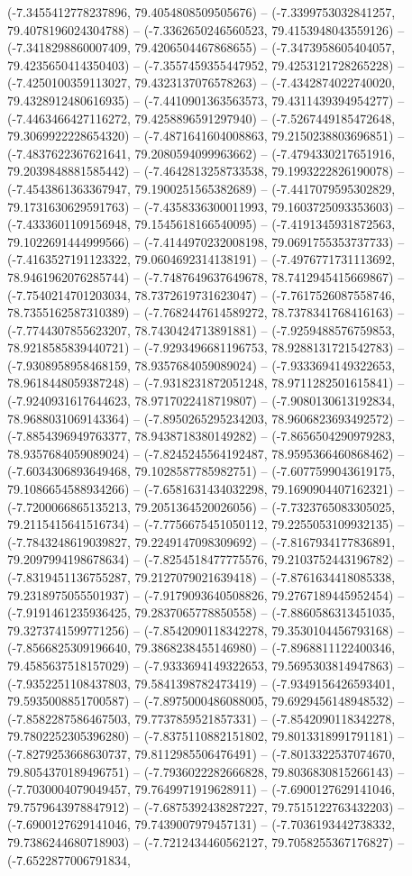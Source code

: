 (-7.3455412778237896, 79.4054808509505676) -- (-7.3399753032841257, 79.4078196024304788) -- (-7.3362650246560523, 79.4153948043559126) -- (-7.3418298860007409, 79.4206504467868655) -- (-7.3473958605404057, 79.4235650414350403) -- (-7.3557459355447952, 79.4253121728265228) -- (-7.4250100359113027, 79.4323137076578263) -- (-7.4342874022740020, 79.4328912480616935) -- (-7.4410901363563573, 79.4311439394954277) -- (-7.4463466427116272, 79.4258896591297940) -- (-7.5267449185472648, 79.3069922228654320) -- (-7.4871641604008863, 79.2150238803696851) -- (-7.4837622367621641, 79.2080594099963662) -- (-7.4794330217651916, 79.2039848881585442) -- (-7.4642813258733538, 79.1993222826190078) -- (-7.4543861363367947, 79.1900251565382689) -- (-7.4417079595302829, 79.1731630629591763) -- (-7.4358336300011993, 79.1603725093353603) -- (-7.4333601109156948, 79.1545618166540095) -- (-7.4191345931872563, 79.1022691444999566) -- (-7.4144970232008198, 79.0691755353737733) -- (-7.4163527191123322, 79.0604692314138191) -- (-7.4976771731113692, 78.9461962076285744) -- (-7.7487649637649678, 78.7412945415669867) -- (-7.7540214701203034, 78.7372619731623047) -- (-7.7617526087558746, 78.7355162587310389) -- (-7.7682447614589272, 78.7378341768416163) -- (-7.7744307855623207, 78.7430424713891881) -- (-7.9259488576759853, 78.9218585839440721) -- (-7.9293496681196753, 78.9288131721542783) -- (-7.9308958958468159, 78.9357684059089024) -- (-7.9333694149322653, 78.9618448059387248) -- (-7.9318231872051248, 78.9711282501615841) -- (-7.9240931617644623, 78.9717022418719807) -- (-7.9080130613192834, 78.9688031069143364) -- (-7.8950265295234203, 78.9606823693492572) -- (-7.8854396949763377, 78.9438718380149282) -- (-7.8656504290979283, 78.9357684059089024) -- (-7.8245245564192487, 78.9595366460868462) -- (-7.6034306893649468, 79.1028587785982751) -- (-7.6077599043619175, 79.1086654588934266) -- (-7.6581631434032298, 79.1690904407162321) -- (-7.7200066865135213, 79.2051364520026056) -- (-7.7323765083305025, 79.2115415641516734) -- (-7.7756675451050112, 79.2255053109932135) -- (-7.7843248619039827, 79.2249147098309692) -- (-7.8167934177836891, 79.2097994198678634) -- (-7.8254518477775576, 79.2103752443196782) -- (-7.8319451136755287, 79.2127079021639418) -- (-7.8761634418085338, 79.2318975055501937) -- (-7.9179093640508826, 79.2767189445952454) -- (-7.9191461235936425, 79.2837065778850558) -- (-7.8860586313451035, 79.3273741599771256) -- (-7.8542090118342278, 79.3530104456793168) -- (-7.8566825309196640, 79.3868238455146980) -- (-7.8968811122400346, 79.4585637518157029) -- (-7.9333694149322653, 79.5695303814947863) -- (-7.9352251108437803, 79.5841398782473419) -- (-7.9349156426593401, 79.5935008851700587) -- (-7.8975000486088005, 79.6929456148948532) -- (-7.8582287586467503, 79.7737859521857331) -- (-7.8542090118342278, 79.7802252305396280) -- (-7.8375110882151802, 79.8013318991791181) -- (-7.8279253668630737, 79.8112985506476491) -- (-7.8013322537074670, 79.8054370189496751) -- (-7.7936022282666828, 79.8036830815266143) -- (-7.7030004079049457, 79.7649971919628911) -- (-7.6900127629141046, 79.7579643978847912) -- (-7.6875392438287227, 79.7515122763432203) -- (-7.6900127629141046, 79.7439007979457131) -- (-7.7036193442738332, 79.7386244680718903) -- (-7.7212434460562127, 79.7058255367176827) -- (-7.6522877006791834, 